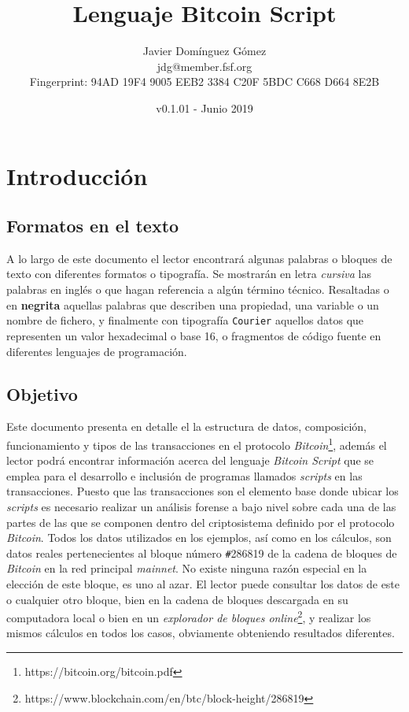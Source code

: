\documentclass{article}
\title{\textbf{Lenguaje Bitcoin Script}}
\author{Javier Domínguez Gómez \\
\small{jdg@member.fsf.org} \\
\small{Fingerprint: 94AD 19F4 9005 EEB2 3384 C20F 5BDC C668 D664 8E2B}}
\date{v0.1.01 - Junio 2019}
\begin{document}
\maketitle

\tableofcontents{}

\vspace{19mm}

\section{Introducción}
    \subsection{Formatos en el texto}
    A lo largo de este documento el lector encontrará algunas palabras o bloques de texto con diferentes formatos o tipografía. Se mostrarán en letra \textit{cursiva} las palabras en inglés o que hagan referencia a algún término técnico. Resaltadas o en \textbf{negrita} aquellas palabras que describen una propiedad, una variable o un nombre de fichero, y finalmente con tipografía \texttt{Courier} aquellos datos que representen un valor hexadecimal o base 16, o fragmentos de código fuente en diferentes lenguajes de programación.
    
    \subsection{Objetivo}
    Este documento presenta en detalle el la estructura de datos, composición, funcionamiento y tipos de las transacciones en el protocolo \textit{Bitcoin}\footnote{https://bitcoin.org/bitcoin.pdf}, además el lector podrá encontrar información acerca del lenguaje \textit{Bitcoin Script} que se emplea para el desarrollo e inclusión de programas llamados \textit{scripts} en las transacciones. Puesto que las transacciones son el elemento base donde ubicar los \textit{scripts} es necesario realizar un análisis forense a bajo nivel sobre cada una de las partes de las que se componen dentro del criptosistema definido por el protocolo \textit{Bitcoin}. Todos los datos utilizados en los ejemplos, así como en los cálculos, son datos reales pertenecientes al bloque número \texttt{\#}286819 de la cadena de bloques de \textit{Bitcoin} en la red principal \textit{mainnet}. No existe ninguna razón especial en la elección de este bloque, es uno al azar. El lector puede consultar los datos de este o cualquier otro bloque, bien en la cadena de bloques descargada en su computadora local o bien en un \textit{explorador de bloques online}\footnote{https://www.blockchain.com/en/btc/block-height/286819}, y realizar los mismos cálculos en todos los casos, obviamente obteniendo resultados diferentes.
    
\end{document}
